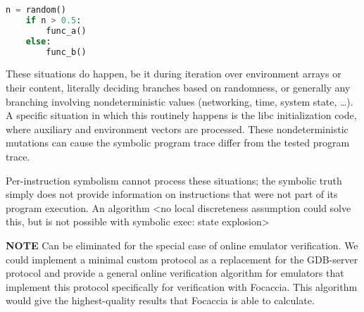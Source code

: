 \begin{lstlisting}[language=Python]
    n = random()
    if n > 0.5:
        func_a()
    else:
        func_b()
\end{lstlisting}

These situations do happen, be it during iteration over environment arrays or their content, literally deciding branches
based on randomness, or generally any branching involving nondeterministic values (networking, time, system state, …). A
specific situation in which this routinely happens is the libc initialization code, where auxiliary and environment
vectors are processed. These nondeterministic mutations can cause the symbolic program trace differ from the tested
program trace.

Per-instruction symbolism cannot process these situations; the symbolic truth simply does not provide information on
instructions that were not part of its program execution. An algorithm <no local discreteness assumption could solve
this, but is not possible with symbolic exec: state explosion>

\textbf{NOTE} Can be eliminated for the special case of online emulator verification. We could implement a minimal
custom protocol as a replacement for the GDB-server protocol and provide a general online verification algorithm for
emulators that implement this protocol specifically for verification with Focaccia. This algorithm would give the
highest-quality results that Focaccia is able to calculate.



%
%
%

